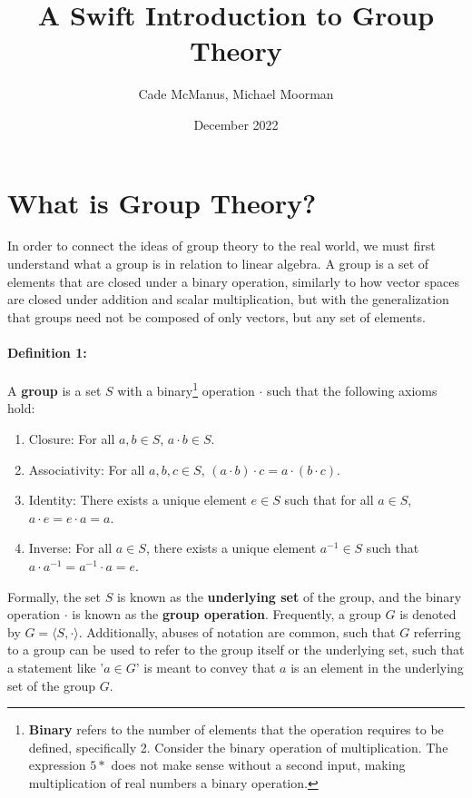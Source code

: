 \documentclass{article}
\title{\textbf{A Swift Introduction to Group Theory}}
\author{Cade McManus, Michael Moorman}
\date{December 2022}
\begin{document}
\maketitle

\section{What is Group Theory?}

In order to connect the ideas of group theory to the real world, we must first understand what a group is 
in relation to linear algebra. A group is a set of elements that are closed under a binary operation,
similarly to how vector spaces are closed under addition and scalar multiplication, but with the 
generalization that groups need not be composed of only vectors, but any set of elements.

\paragraph*{Definition 1:} A \textbf{group} is a set $S$ with a binary\footnote[1]{\textbf{Binary} refers to the number of elements that the operation requires to be defined, specifically 2. Consider the binary operation of multiplication. The expression $5*$ does not make sense without a second input, making multiplication of real numbers a binary operation. }
operation $\cdot$ 
such that the following axioms hold:
\begin{enumerate}
    \item Closure: For all $a,b \in S$, $a \cdot b \in S$.
    \item Associativity: For all $a,b,c \in S$, $(a \cdot b) \cdot c = a \cdot (b \cdot c)$.
    \item Identity: There exists a unique element $e \in S$ such that for all $a \in S$, $a \cdot e = e \cdot a = a$.
    \item Inverse: For all $a \in S$, there exists a unique element $a^{-1} \in S$ such that $a \cdot a^{-1} = a^{-1} \cdot a = e$.
\end{enumerate}
Formally, the set $S$ is known as the \textbf{underlying set} of the group, and 
the binary operation $\cdot$ is known as the \textbf{group operation}. Frequently,
a group $G$ is denoted by $G = \langle S, \cdot \rangle$. Additionally, abuses 
of notation are common, such that $G$ referring to a group can be used to refer 
to the group itself or the underlying set, such that a statement like '$a\in G$'
is meant to convey that $a$ is an element in the underlying set of the group $G$.
\end{document}

